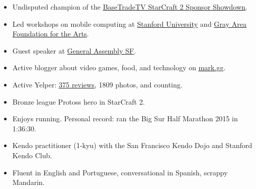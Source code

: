 

\begin{cvparagraph}


\begin{justify}
\begin{itemize}[leftmargin=2ex, nosep]
    \setlength{\parskip}{0pt}
    \setlength\itemsep{0.15em}
    \renewcommand{\labelitemi}{\bullet}
    
    \item Undisputed champion of the \href{http://www.teamliquid.net/forum/sc2-tournaments/529105-basetradetv-sponsor-showdown}{\underline {BaseTradeTV StarCraft 2 Sponsor Showdown}}.
    \item Led workshops on mobile computing at \href{https://ccrma.stanford.edu/workshops/music-and-mobile-computing}{\underline{Stanford University}} and \href{http://main.dev.gaffta.org/?author=81}{\underline{Gray Area Foundation for the Arts}}.
    \item Guest speaker at \href{https://generalassemb.ly/instructors/mark-cerqueira/10476}{\underline{General Assembly SF}}.
	\item Active blogger about video games, food, and technology on \href{mark.gg}{\underline{mark.gg}}.
	\item Active Yelper: \href{markcerqueira.yelp.com}{\underline{375 reviews}}, 1809 photos, and counting.
	\item Bronze league Protoss hero in StarCraft 2.
	\item Enjoys running. Personal record: ran the Big Sur Half Marathon 2015 in 1:36:30.
	\item Kendo practitioner (1-kyu) with the San Francisco Kendo Dojo and Stanford Kendo Club.
	\item Fluent in English and Portuguese, conversational in Spanish, scrappy Mandarin.
	

\end{itemize}
\end{justify}

\end{cvparagraph}